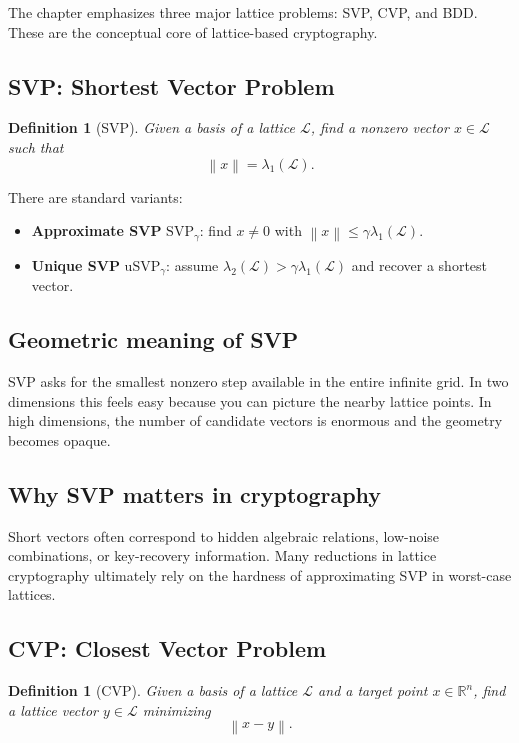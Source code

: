 \documentclass[11pt]{article}
\newtheorem{definition}[theorem]{Definition}
\newcommand{\R}{\mathbb{R}}
\newcommand{\norm}[1]{\left\lVert #1 \right\rVert}
\newcommand{\calL}{\mathcal{L}}
\begin{document}
The chapter emphasizes three major lattice problems: SVP, CVP, and BDD. These are the conceptual core of lattice-based cryptography.

\subsection{SVP: Shortest Vector Problem}

\begin{definition}[SVP]
Given a basis of a lattice $\calL$, find a nonzero vector $x\in \calL$ such that
\[
\norm{x}=\lambda_1(\calL).
\]
\end{definition}

There are standard variants:
\begin{itemize}
    \item \textbf{Approximate SVP} $\mathrm{SVP}_\gamma$: find $x\neq 0$ with $\norm{x}\le \gamma\lambda_1(\calL)$.
    \item \textbf{Unique SVP} $\mathrm{uSVP}_\gamma$: assume $\lambda_2(\calL) > \gamma\lambda_1(\calL)$ and recover a shortest vector.
\end{itemize}

\subsection{Geometric meaning of SVP}
SVP asks for the smallest nonzero step available in the entire infinite grid. In two dimensions this feels easy because you can picture the nearby lattice points. In high dimensions, the number of candidate vectors is enormous and the geometry becomes opaque.

\subsection{Why SVP matters in cryptography}
Short vectors often correspond to hidden algebraic relations, low-noise combinations, or key-recovery information. Many reductions in lattice cryptography ultimately rely on the hardness of approximating SVP in worst-case lattices.

\subsection{CVP: Closest Vector Problem}

\begin{definition}[CVP]
Given a basis of a lattice $\calL$ and a target point $x\in \R^n$, find a lattice vector $y\in \calL$ minimizing
\[
\norm{x-y}.
\]
\end{definition}
\end{document}
